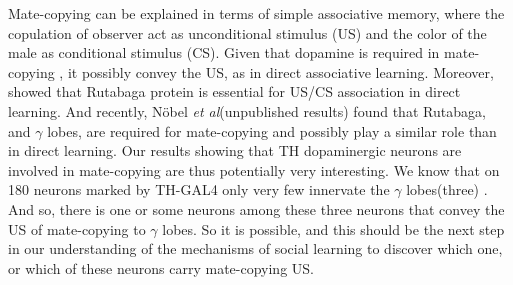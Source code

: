 \documentclass[a4paper, 12pt]{article}
\begin{document}
Mate-copying can be explained in terms of simple associative memory, where the copulation of observer act as unconditional stimulus (US) and the color of the male as conditional stimulus (CS). Given that dopamine is required in mate-copying \parencite{monier_dopamine_2018}, it possibly convey the US, as in direct associative learning. Moreover, \textcite{avargues_information_2015} showed that Rutabaga protein is essential for US/CS association in direct learning. And recently, Nöbel \textit{et al}(unpublished results) found that Rutabaga, and \(\gamma\) lobes, are required for mate-copying and possibly play a similar role than in direct learning. Our results showing that TH dopaminergic neurons are involved in mate-copying are thus potentially very interesting. We know that on 180 neurons marked by TH-GAL4 only very few innervate the \(\gamma\) lobes(three) \parencite{aso_neuronal_2014}. And so, there is one or some neurons among these three neurons that convey the US of mate-copying to \(\gamma\) lobes.  So it is possible, and this should be the next step in our understanding of the mechanisms of social learning to discover which one, or which of these neurons carry mate-copying US. 


\bigskip
\end{document}
